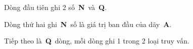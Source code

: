 Dòng đầu tiên ghi 2 số \textbf{N} và \textbf{Q}.

Dòng thứ hai ghi \textbf{N} số là giá trị ban đầu của dãy \textbf{A}.

Tiếp theo là \textbf{Q} dòng, mỗi dòng ghi 1 trong 2 loại truy vấn.